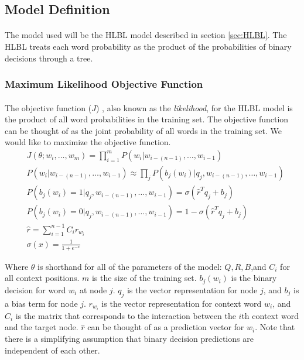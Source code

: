 \subsection{Model Definition}
\paragraph{}
The model used will be the HLBL model described in section \ref{sec:HLBL}. The HLBL treats each word probability as the product of the probabilities of binary decisions through a tree.

\subsubsection{Maximum Likelihood Objective Function}
\paragraph{}
The objective function ($J$) , also known as the \emph{likelihood}, for the HLBL model is the product of all word probabilities in the training set. The objective function can be thought of as the joint probability of all words in the training set. We would like to maximize the objective function. 
\begin{align}
&J(\theta;w_i,\dots, w_m) = \prod_{i=1}^{m} P(w_i | w_{i-(n-1)},\dots, w_{i-1})
\\
&P(w_i | w_{i-(n-1)},\dots, w_{i-1})  \approx \prod_j P(b_j(w_i) | q_j, w_{i-(n-1)},\dots, w_{i-1})
\\ 
&P(b_j(w_i) = 1 | q_j, w_{i-(n-1)},\dots, w_{i-1}) =  \sigma( \hat{r}^T q_{j} +b_{j}) \nonumber
\\ 
&P(b_j(w_i) = 0 | q_j, w_{i-(n-1)},\dots, w_{i-1}) =  1- \sigma( \hat{r}^T q_{j} +b_{j}) \nonumber
\\ 
&\hat{r} = \sum_{i=1}^{n-1} C_i r_{w_i} \nonumber
\\  
&\sigma(x) = \frac{1}{1+e^{-x}} \label{eq:sigmoid} \nonumber
\end{align}

Where $\theta$ is shorthand for all of the parameters of the model: $Q,R,B$,and $C_i$ for all context positions. $m$ is the size of the training set.  $b_j(w_i)$ is the binary decision for word $w_i$ at node $j$. $q_j$ is the vector representation for node $j$, and $b_{j}$ is a bias term for node $j$. $r_{w_i}$ is the vector representation for context word $w_i$, and $C_i$ is the matrix that corresponds to the interaction between the $i$th context word and the target node.  $\hat{r}$ can be thought of as a prediction vector for $w_i$. Note that there is a simplifying assumption that binary decision predictions are independent of each other.

